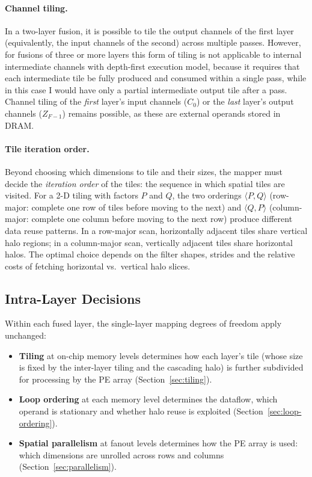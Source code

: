 \paragraph{Channel tiling.}
In a two-layer fusion, it is possible to tile the output channels of the
first layer (equivalently, the input channels of the second) across
multiple passes.
However, for fusions of three or more layers this form of tiling is
not applicable to internal intermediate channels with depth-first
execution model, because it requires that each intermediate tile be fully
produced and consumed within a single pass, while in this case I would have 
only a partial intermediate output tile after a pass. 
Channel tiling of the \emph{first} layer's input channels ($C_0$)
or the \emph{last} layer's output channels ($Z_{F-1}$) remains
possible, as these are external operands stored in DRAM.


\paragraph{Tile iteration order.}
Beyond choosing which dimensions to tile and their sizes, the mapper
must decide the \emph{iteration order} of the tiles: the sequence in
which spatial tiles are visited.
For a 2-D tiling with factors $P$ and $Q$, the two orderings
$\langle P, Q \rangle$ (row-major: complete one row of tiles before
moving to the next) and $\langle Q, P \rangle$ (column-major: complete
one column before moving to the next row) produce different data
reuse patterns.
In a row-major scan, horizontally adjacent tiles share vertical
halo regions; in a column-major scan, vertically adjacent tiles
share horizontal halos.
The optimal choice depends on the filter shapes, strides and the relative
costs of fetching horizontal vs.\ vertical halo slices.


\subsection{Intra-Layer Decisions}
\label{sec:fds-intra}

Within each fused layer, the single-layer mapping degrees of freedom
apply unchanged:
\begin{itemize}
  \item \textbf{Tiling} at on-chip memory levels determines how each
        layer's tile (whose size is fixed by the inter-layer tiling and
        the cascading halo) is further subdivided for processing by the
        PE array (Section~\ref{sec:tiling}).
  \item \textbf{Loop ordering} at each memory level determines the
        dataflow, which operand is stationary and whether halo reuse
        is exploited (Section~\ref{sec:loop-ordering}).
  \item \textbf{Spatial parallelism} at fanout levels determines how
        the PE array is used: which dimensions are unrolled across
        rows and columns (Section~\ref{sec:parallelism}).
\end{itemize}


